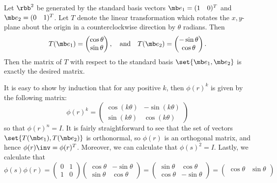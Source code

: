 \begin{solenum}
    \item Let $\rbb^2$ be generated by the standard basis vectors $\mb e_1 = (1 \quad 0)^T$ and $\mb e_2 = (0 \quad 1)^T$.
	Let $T$ denote the linear transformation which rotates the $x,y$-plane about the origin in a counterclockwise direction by $\theta$ radians.
	Then
    \[
        T(\mb e_1) = 
        \begin{pmatrix}
            \cos \theta \\
            \sin \theta
        \end{pmatrix}, \quad \text{and} \quad
        T(\mb e_2) = 
        \begin{pmatrix}
            -\sin \theta \\
            \cos \theta
        \end{pmatrix}.
    \]
    Then the matrix of $T$ with respect to the standard basis $\set{\mb e_1, \mb e_2}$ is exactly the desired matrix.
    \item It is easy to show by induction that for any positive $k$, then $\phi(r)^k$ is given by the following matrix:
    \[
        \phi(r)^k = \begin{pmatrix}
            \cos (k\theta) & -\sin (k\theta) \\
            \sin (k\theta) & \cos (k\theta)
        \end{pmatrix}
    \]
    so that $\phi(r)^n = I$.
	It is fairly straightforward to see that the set of vectors $\set{T(\mb e_1), T(\mb e_2)}$ is orthonormal, so $\phi(r)$ is an orthogonal matrix, and hence $\phi(r)\inv = \phi(r)^T$.
	Moreover, we can calculate that $\phi(s)^2 = I$.
	Lastly, we calculate that
    \[
        \phi(s)\phi(r) = 
        \begin{pmatrix}
            0 & 1 \\
            1 & 0
        \end{pmatrix}
        \begin{pmatrix}
            \cos \theta & -\sin \theta \\
            \sin \theta & \cos \theta
        \end{pmatrix} = 
        \begin{pmatrix}
            \sin \theta & \cos \theta \\
            \cos \theta & -\sin \theta
        \end{pmatrix} = 
        \begin{pmatrix}
            \cos \theta & \sin \theta \\

\end{pmatrix}\]
\end{solenum}
